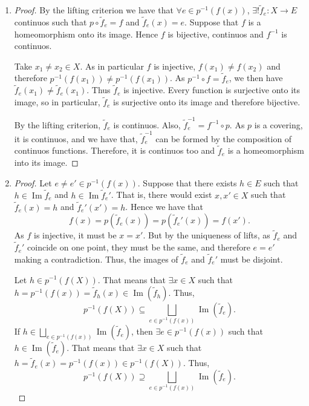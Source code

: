 \documentclass[11pt,a4paper]{article}
\newcommand{\im}{\operatorname{Im}}
\begin{document}
  \begin{enumerate}[label=\alph*)]
    \item \begin{proof} By the lifting criterion we have that $ \forall e \in p^{-1}(f(x)) $, $ \exists ! \tilde f_e \colon X \to E $ continuos such that $ p \circ \tilde f_e = f $ and $ \tilde f_e(x) = e $. Suppose that $ f $ is a homeomorphism onto its image. Hence $ f $ is bijective, continuos and $ f^{-1} $ is continuos.
    
    Take $ x_1 \neq x_2 \in X $. As in particular $ f $ is injective, $ f(x_1) \neq f(x_2) $ and therefore $ p^{-1}(f(x_1)) \neq p^{-1}(f(x_1)) $. As $ p^{-1} \circ f = \tilde f_e $, we then have $ \tilde f_e(x_1) \neq \tilde f_e(x_1) $. Thus $ \tilde f_e $ is injective. Every function is surjective onto its image, so in particular, $ \tilde f_e $ is surjective onto its image and therefore bijective.
  
    By the lifting criterion, $ \tilde f_e $ is continuos. Also, $ \tilde f_e^{-1} = f^{-1} \circ p $. As $ p $ is a covering, it is continuos, and we have that, $ \tilde f_e^{-1} $ can be formed by the composition of continuos functions. Therefore, it is continuos too and $ \tilde f_e $ is a homeomorphism into its image.
    \end{proof}
  
    \item \begin{proof} Let $ e \neq e' \in p^{-1}(f(x)) $. Suppose that there exists $ h \in E $ such that $ h \in \im \tilde f_e $ and $ h \in \im \tilde f_e' $. That is, there would exist $ x, x' \in X $ such that $ \tilde f_e(x) = h $ and $ \tilde f_e'(x') = h $. Hence we have that
    $$
      f(x) = p(\tilde f_e(x)) = p(\tilde f_e'(x)) = f(x').
    $$
    As $ f $ is injective, it must be $ x = x' $. But by the uniqueness of lifts, as $ \tilde f_e $ and  $ \tilde f_e' $ coincide on one point, they must be the same, and therefore $ e = e' $ making a contradiction. Thus, the images of $ \tilde f_e $ and $ \tilde f_e' $ must be disjoint.

    Let $ h \in p^{-1} (f(X)) $. That means that $ \exists x \in X $ such that $ h = p^{-1}(f(x)) = \tilde f_h(x) \in \im(\tilde f_h)$. Thus,
    $$
      p^{-1} (f(X)) \subseteq \bigsqcup_{e \in p^{-1} (f(x))} \im(\tilde f_e).
    $$
    If $ h \in \bigsqcup_{e \in p^{-1} (f(x))} \im(\tilde f_e) $, then $ \exists e \in p^{-1} (f(x)) $ such that $ h \in \im(\tilde f_e) $. That means that $ \exists x \in X $ such that $ h = \tilde f_e(x) = p^{-1}(f(x)) \in p^{-1}(f(X)) $. Thus,
    $$
      p^{-1} (f(X)) \supseteq \bigsqcup_{e \in p^{-1} (f(x))} \im(\tilde f_e).
    $$
    \end{proof}
  \end{enumerate}
\end{document}
